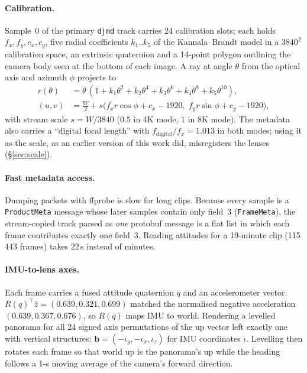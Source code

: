 \documentclass[11pt]{article}
\begin{document}
\paragraph{Calibration.} Sample~0 of the primary \texttt{djmd} track carries 24 calibration slots; each holds $f_x,f_y,c_x,c_y$, five radial coefficients $k_1..k_5$ of the Kannala--Brandt model in a $3840^2$ calibration space, an extrinsic quaternion and a 14-point polygon outlining the camera body seen at the bottom of each image. A ray at angle $\theta$ from the optical axis and azimuth $\phi$ projects to
\begin{equation}
\begin{aligned}
r(\theta)&=\theta\,(1+k_1\theta^2+k_2\theta^4+k_3\theta^6+k_4\theta^8+k_5\theta^{10}),\\
(u,v)&=\tfrac{W}{2}+s\big(f_x r\cos\phi + c_x-1920,\; f_y r\sin\phi + c_y-1920\big),
\end{aligned}
\end{equation}
with stream scale $s=W/3840$ ($0.5$ in 4K mode, $1$ in 8K mode). The metadata also carries a ``digital focal length'' with $f_{\mathrm{digital}}/f_x=1.013$ in both modes; using it as the scale, as an earlier version of this work did, misregisters the lenses (\S\ref{sec:scale}).

\paragraph{Fast metadata access.} Dumping packets with ffprobe is slow for long clips. Because every sample is a \texttt{ProductMeta} message whose later samples contain only field~3 (\texttt{FrameMeta}), the stream-copied track parsed as \emph{one} protobuf message is a flat list in which each frame contributes exactly one field~3. Reading attitudes for a 19-minute clip (115\,443 frames) takes 22\,s instead of minutes.

\paragraph{IMU-to-lens axes.} Each frame carries a fused attitude quaternion $q$ and an accelerometer vector. $R(q)^\top\hat z=(0.639,0.321,0.699)$ matched the normalised negative acceleration $(0.639,0.367,0.676)$, so $R(q)$ maps IMU to world. Rendering a levelled panorama for all 24 signed axis permutations of the up vector left exactly one with vertical structures: $\mathbf{b}=(-\iota_y,-\iota_x,\iota_z)$ for IMU coordinates $\iota$. Levelling then rotates each frame so that world up is the panorama's up while the heading follows a 1-s moving average of the camera's forward direction.
\end{document}
